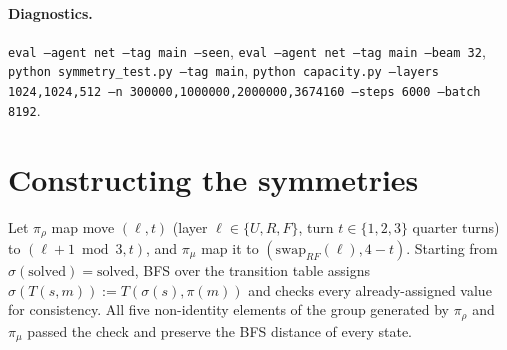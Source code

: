 \documentclass[11pt]{article}
\begin{document}
\paragraph{Diagnostics.}
\texttt{eval --agent net --tag main --seen}, \texttt{eval --agent net --tag main --beam 32},
\texttt{python symmetry\_test.py --tag main}, \texttt{python capacity.py --layers 1024,1024,512
--n 300000,1000000,2000000,3674160 --steps 6000 --batch 8192}.

\section{Constructing the symmetries}
Let $\pi_\rho$ map move $(\ell, t)$ (layer $\ell\in\{U,R,F\}$, turn $t\in\{1,2,3\}$ quarter
turns) to $(\ell+1 \bmod 3, t)$, and $\pi_\mu$ map it to $(\mathrm{swap}_{RF}(\ell), 4-t)$.
Starting from $\sigma(\text{solved})=\text{solved}$, BFS over the transition table assigns
$\sigma(T(s,m)) := T(\sigma(s),\pi(m))$ and checks every already-assigned value for consistency.
All five non-identity elements of the group generated by $\pi_\rho$ and $\pi_\mu$ passed the
check and preserve the BFS distance of every state.
\end{document}
